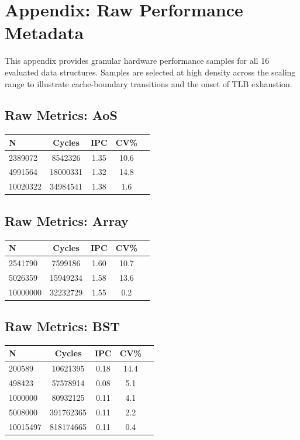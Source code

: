 \section{Appendix: Raw Performance Metadata}
This appendix provides granular hardware performance samples for all 16 evaluated data structures. Samples are selected at high density across the scaling range to illustrate cache-boundary transitions and the onset of TLB exhaustion.

\subsection*{Raw Metrics: AoS}
\begin{table}[H]
\centering
{}
\begin{tabular}{@{}lcccc@{}}
\toprule
\rowcolor{teal!20} N & Cycles & IPC & CV\% \\ \midrule
2389072 & 8542326 & 1.35 & 10.6 \\ 
4991564 & 18000331 & 1.32 & 14.8 \\ 
10020322 & 34984541 & 1.38 & 1.6 \\ 
\bottomrule
\end{tabular}
\end{table}

\subsection*{Raw Metrics: Array}
\begin{table}[H]
\centering
{}
\begin{tabular}{@{}lcccc@{}}
\toprule
\rowcolor{teal!20} N & Cycles & IPC & CV\% \\ \midrule
2541790 & 7599186 & 1.60 & 10.7 \\ 
5026359 & 15949234 & 1.58 & 13.6 \\ 
10000000 & 32232729 & 1.55 & 0.2 \\ 
\bottomrule
\end{tabular}
\end{table}

\clearpage
\subsection*{Raw Metrics: BST}
\begin{table}[H]
\centering
{}
\begin{tabular}{@{}lcccc@{}}
\toprule
\rowcolor{teal!20} N & Cycles & IPC & CV\% \\ \midrule
200589 & 10621395 & 0.18 & 14.4 \\ 
498423 & 57578914 & 0.08 & 5.1 \\ 
1000000 & 80932125 & 0.11 & 4.1 \\ 
5008000 & 391762365 & 0.11 & 2.2 \\ 
10015497 & 818174665 & 0.11 & 0.4 \\ 
\bottomrule
\end{tabular}
\end{table}

